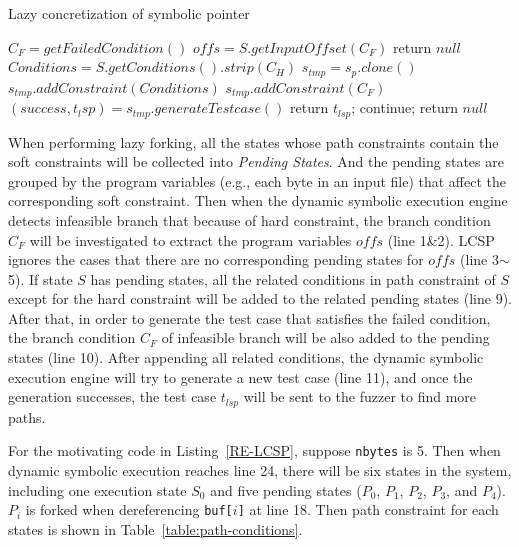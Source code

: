  

\begin{algorithm}
 \LinesNumbered
  \caption{Lazy concretization of symbolic pointer}
  \label{LCSP}
  $C_F = getFailedCondition()$\;
  $offs = S.getInputOffset(C_F)$\;
  {
    return $null$\;
  }
  $Conditions = S.getConditions().strip(C_H)$\;
  {
    $s_{tmp} = s_p.clone()$\;
    $s_{tmp}.addConstraint(Conditions)$\;
    $s_{tmp}.addConstraint(C_F)$\;
    $(success, t_lsp) = s_{tmp}.generateTestcase()$\;
    {
      return $t_{lsp}$;
    } {
      continue;
    }
  }
  return $null$\;
\end{algorithm}

When performing lazy forking, all the states whose path constraints contain the soft constraints will be collected into \emph{Pending States}. And the pending states are grouped by the program variables (e.g., each byte in an input file) that affect the corresponding soft constraint. 
Then when the dynamic symbolic execution engine detects infeasible branch that because of hard constraint, the branch condition $C_F$ will be investigated to extract the program variables $offs$ (line 1\&2). 
 LCSP ignores the cases that there are no corresponding pending states for $offs$ (line 3$\sim$5). 
 If state $S$ has pending states, all the related conditions in path constraint of $S$ except for the hard constraint will be added to the related pending states (line 9).
 After that, in order to generate the test case that satisfies the failed condition, the branch condition $C_F$ of infeasible branch will be also added to the pending states (line 10).
 After appending all related conditions, the dynamic symbolic execution engine will try to generate a new test case (line 11), and once the generation successes, the test case $t_{lsp}$ will be sent to the fuzzer to find more paths.

For the motivating code in Listing~\ref{RE-LCSP}, suppose \texttt{nbytes} is 5. Then when dynamic symbolic execution reaches line 24, there will be six states in the system, including one execution state $S_0$ and five pending states ($P_0$, $P_1$, $P_2$, $P_3$, and $P_4$). $P_i$ is forked when dereferencing \texttt{buf[$i$]} at line 18.
Then path constraint for each states is shown in Table~\ref{table:path-conditions}.

